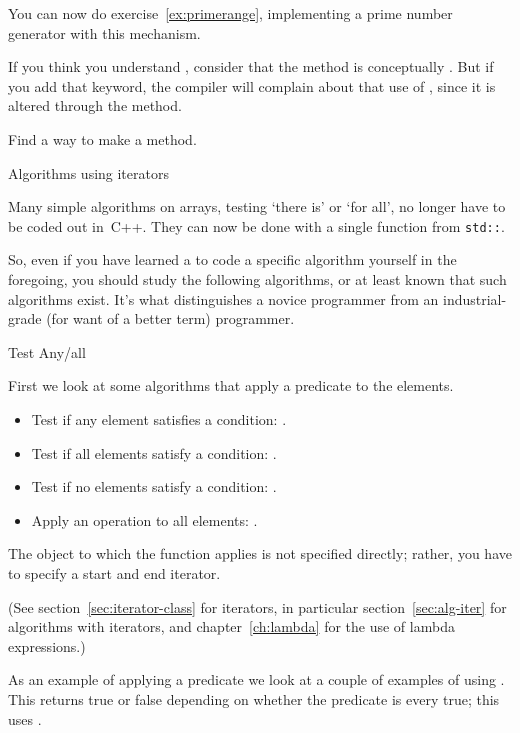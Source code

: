 \begin{exercise}
  You can now do exercise~\ref{ex:primerange}, implementing a prime
  number generator with this mechanism.
\end{exercise}

If you think you understand , consider that the 
method is conceptually . But if you add that keyword, the
compiler will complain about that use of , since it is
altered through the  method.

\begin{exercise}
  \label{ex:rangeconstiter}
  Find a way to make  a  method.
\end{exercise}

 {Algorithms using iterators}
\label{sec:algorithm}

Many simple algorithms on arrays, testing `there is' or `for all', no
longer have to be coded out in~C++. They can now be done with a single
function from \lstinline{std::}.

So, even if you have learned a to code a specific algorithm yourself
in the foregoing,
you should study the following algorithms,
or at least known that such algorithms exist.
It's what distinguishes a novice programmer
from an industrial-grade (for want of a better term) programmer.

 {Test Any/all}
\label{sec:alg-iter}

First we look at some algorithms that apply a predicate
to the elements.
\begin{itemize}
\item Test if any element satisfies a condition:
  .
\item Test if all elements satisfy a condition:
  .
\item Test if no elements satisfy a condition:
  .
\item Apply an operation to all elements: .
\end{itemize}

The object to which the function applies is not specified directly; 
rather, you have to specify a start
and end iterator.

(See section~\ref{sec:iterator-class} for iterators,
in particular section~\ref{sec:alg-iter} for algorithms with iterators,
and
chapter~\ref{ch:lambda} for the use of lambda expressions.)

As an example of applying a predicate we look at a couple of examples
of using .
This returns true or false depending on whether the predicate is every true;
this uses .

